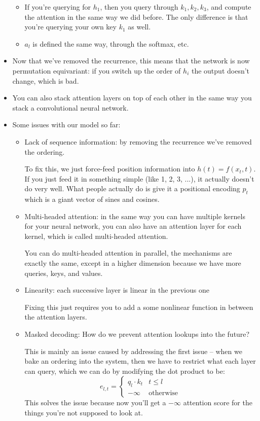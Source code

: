 \begin{itemize}
\begin{itemize}
			\item If you're querying for \( h_1 \), then you query through \( k_1,
				k_2, k_3 \), and compute the attention in the same way we did before.
				The only difference is that you're querying your own key \( k_1 \) as
				well. 
			\item \( a_l \) is defined the same way, through the softmax, etc. 
		\end{itemize}
	\item Now that we've removed the recurrence, this means that the network is now
		permutation equivariant: if you switch up the order of \( h_i \) the output
		doesn't change, which is bad.  
	\item You can also stack attention layers on top of each other in the same way
		you stack a convolutional neural network. 
	\item Some issues with our model so far:
		\begin{itemize}
			\item Lack of sequence information: by removing the recurrence we've
				removed the ordering.  

				To fix this, we just force-feed position information into \( h(t) =
				f(x_t, t)\). If you just feed it in something simple (like 1, 2, 3,
				...), it actually
				doesn't do very well. What people actually do is give it a positional
				encoding \( p_t \) which is a giant vector of sines and cosines. 
			\item Multi-headed attention: in the same way you can have multiple
				kernels for your neural network, you can also have an attention layer
				for each kernel, which is called multi-headed attention.
				
				You can do multi-headed attention in parallel, the mechanisms are
				exactly the same, except in a higher dimension because we have more
				queries, keys, and values. 
			\item Linearity: each successive layer is linear in the previous one

				Fixing this just requires you to add a some nonlinear function in
				between the attention layers. 
			\item Masked decoding: How do we prevent attention lookups into the
				future?  

				This is mainly an issue caused by addressing the first issue -- when
				we bake an ordering into the system, then we have to restrict what
				each layer can query, which we can do by modifying the dot product to
				be:
				\[
					e_{l, t} = \begin{cases}
						q_l \cdot k_t & t \leq l\\
						-\infty & \text{otherwise}
					\end{cases}
				\]
				This solves the issue because now you'll get a \( -\infty \)
				attention score for the things you're not supposed to look at. 
				

\end{itemize}
\end{itemize}
